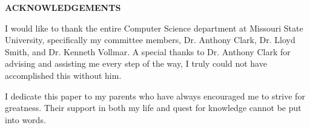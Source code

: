 \begin{center}
    \textbf{ACKNOWLEDGEMENTS}
\end{center}
\doublespacing
\par
I would like to thank the entire Computer Science department at Missouri State University, specifically my committee members, Dr. Anthony Clark, Dr. Lloyd Smith, and Dr. Kenneth Vollmar.
A special thanks to Dr. Anthony Clark for advising and assisting me every step of the way, I truly could not have accomplished this without him.
\par
\hfill
\par
I dedicate this paper to my parents who have always encouraged me to strive for greatness.
Their support in both my life and quest for knowledge cannot be put into words.
